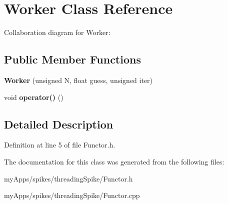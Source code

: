 \hypertarget{classWorker}{}\section{Worker Class Reference}
\label{classWorker}


Collaboration diagram for Worker\+:
\subsection*{Public Member Functions}
\begin{DoxyCompactItemize}
\item 
\mbox{\label{classWorker_a0f586b92280ae16cd9abab2dca3f48b4}} 
{\bfseries Worker} (unsigned N, float guess, unsigned iter)
\item 
\mbox{\label{classWorker_a866b25ed879589d80aa8df26a201225c}} 
void {\bfseries operator()} ()
\end{DoxyCompactItemize}


\subsection{Detailed Description}


Definition at line 5 of file Functor.\+h.



The documentation for this class was generated from the following files\+:\begin{DoxyCompactItemize}
\item 
my\+Apps/spikes/threading\+Spike/Functor.\+h\item 
my\+Apps/spikes/threading\+Spike/Functor.\+cpp\end{DoxyCompactItemize}
